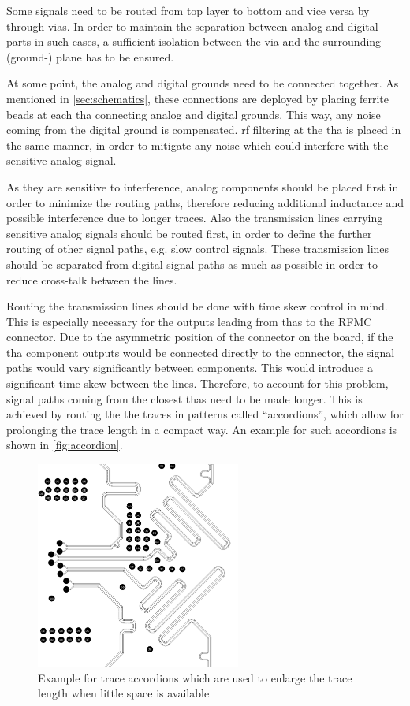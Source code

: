 Some signals need to be routed from top layer to bottom and vice versa by through vias. 
In order to maintain the separation between analog and digital parts in such cases, a sufficient isolation between the via and the surrounding (ground-) plane has to be ensured.

At some point, the analog and digital grounds need to be connected together. 
As mentioned in \autoref{sec:schematics}, these connections are deployed by placing ferrite beads at each \gls{tha} connecting analog and digital grounds.
This way, any noise coming from the digital ground is compensated. 
\gls{rf} filtering at the \gls{tha} is placed in the same manner, in order to mitigate any noise which could interfere with the sensitive analog signal.

As they are sensitive to interference, analog components should be placed first in order to minimize the routing paths, therefore reducing additional inductance and possible interference due to longer traces.
Also the transmission lines carrying sensitive analog signals should be routed first, in order to define the further routing of other signal paths, e.g. slow control signals. 
These transmission lines should be separated from digital signal paths as much as possible in order to reduce cross-talk between the lines. 

Routing the transmission lines should be done with time skew control in mind. 
This is especially necessary for the outputs leading from \glspl{tha} to the RFMC connector. 
Due to the asymmetric position of the connector on the board, if the \gls{tha} component outputs would be connected directly to the connector, the signal paths would vary significantly between components.
This would introduce a significant time skew between the lines.
Therefore, to account for this problem, signal paths coming from the closest \glspl{tha} need to be made longer.
This is achieved by routing the the traces in patterns called ``accordions'', which allow for prolonging the trace length in a compact way.
An example for such accordions is shown in \autoref{fig:accordion}.
\begin{figure}[tb]
	\centering
	\includegraphics[width = 0.6\textwidth]{chap/04-theresa/img/pcb/accordion}
	\caption[Trace accordions]{Example for trace accordions which are used to enlarge the trace length when little space is available}
	\label{fig:accordion}
\end{figure}

